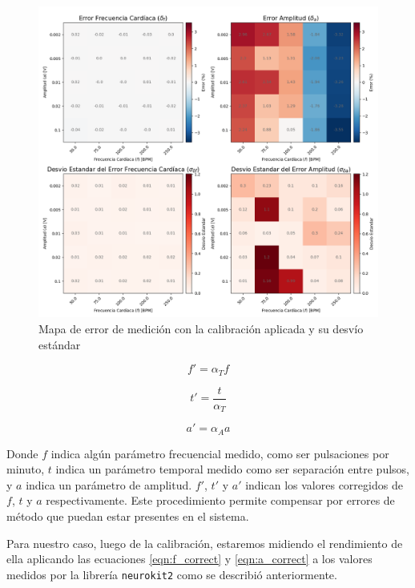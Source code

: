 \documentclass[conference]{IEEEtran}
\begin{document}
\begin{figure}[t]
    \centering
    \includegraphics[width=\textwidth]{figs/test_error_map.png}
    \caption{Mapa de error de medición con la calibración aplicada y su desvío 
    estándar}
    \label{fig:plot_error_con_calib}

\end{figure}

\begin{equation}
    f' = \alpha_{T} f
    \label{eqn:f_correct}
\end{equation} 

\begin{equation}
    t' = \frac{t}{\alpha_{T}}
    \label{eqn:t_correct}
\end{equation} 

\begin{equation}
    a' = \alpha_{A} a
    \label{eqn:a_correct}
\end{equation} 
        
Donde $f$ indica algún parámetro frecuencial medido, como ser pulsaciones por
minuto, $t$ indica un parámetro temporal medido como ser separación entre
pulsos, y $a$ indica un parámetro de amplitud. $f'$, $t'$ y $a'$ indican los
valores corregidos de $f$, $t$ y $a$ respectivamente.
Este procedimiento permite compensar por errores de método que puedan estar
presentes en el sistema.

Para nuestro caso, luego de la calibración, estaremos midiendo el rendimiento
de ella aplicando las ecuaciones \ref{eqn:f_correct} y \ref{eqn:a_correct} a 
los valores medidos por la librería \texttt{neurokit2} como se describió
anteriormente.
\end{document}
